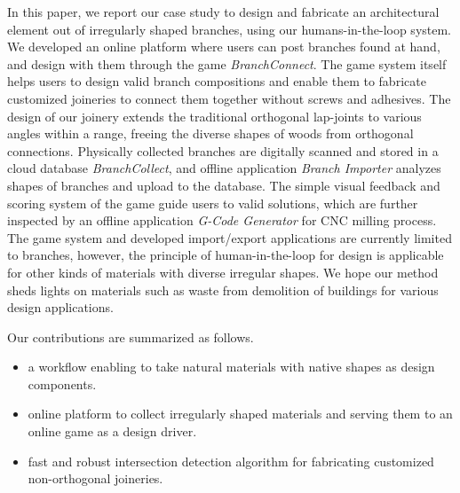In this paper, we report our case study to design and fabricate an architectural element out of irregularly shaped branches, using our humans-in-the-loop system.
We developed an online platform where users can post branches found at hand, and design with them through the game \textit{BranchConnect}.
The game system itself helps users to design valid branch compositions and enable them to fabricate customized joineries to connect them together without screws and adhesives.
The design of our joinery extends the traditional orthogonal lap-joints to various angles within a range, freeing the diverse shapes of woods from orthogonal connections.
Physically collected branches are digitally scanned and stored in a cloud database \textit{BranchCollect}, and offline application \textit{Branch Importer} analyzes shapes of branches and upload to the database.
The simple visual feedback and scoring system of the game guide users to valid solutions, which are further inspected by an offline application \textit{G-Code Generator} for CNC milling process.
The game system and developed import/export applications are currently limited to branches, however, the principle of human-in-the-loop for design is applicable for other kinds of materials with diverse irregular shapes.
We hope our method sheds lights on materials such as waste from demolition of buildings for various design applications.



Our contributions are summarized as follows.
\begin{itemize}
 \item{a workflow enabling to take natural materials with native shapes as design components.}
 \item{online platform to collect irregularly shaped materials and serving them to an online game as a design driver.}
 \item{fast and robust intersection detection algorithm for fabricating customized non-orthogonal joineries.}
\end{itemize}



